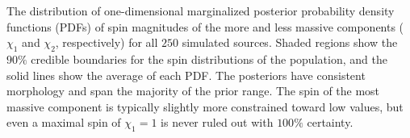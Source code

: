 \label{fig:spinPDFcred} The distribution of one-dimensional marginalized posterior probability density functions (PDFs) of spin magnitudes of the more and less massive components ($\chi_1$ and $\chi_2$, respectively) for all $250$ simulated sources. Shaded regions show the $90\%$ credible boundaries for the spin distributions of the population, and the solid lines show the average of each PDF.  The posteriors have consistent morphology and span the majority of the prior range.  The spin of the most massive component is typically slightly more constrained toward low values, but even a maximal spin of $\chi_1 = 1$ is never ruled out with $100\%$ certainty.
  
  
  
  